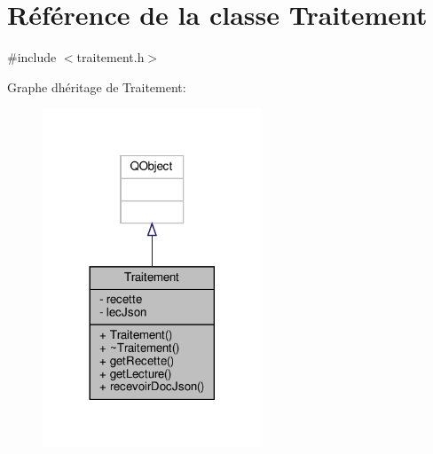 \hypertarget{classTraitement}{}\section{Référence de la classe Traitement}
\label{classTraitement}


{\ttfamily \#include $<$traitement.\+h$>$}



Graphe d\textquotesingle{}héritage de Traitement\+:\nopagebreak
\begin{figure}[H]
\begin{center}
\leavevmode
\includegraphics[width=185pt]{classTraitement__inherit__graph}
\end{center}
\end{figure}


